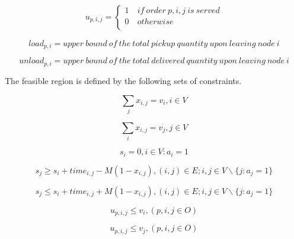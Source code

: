 \begin{equation}
   \begin{split}
   u_{p,i,j}=\left\{
                \begin{array}{ll}
                  1\ & if\ order\ p,i,j\ is\ served\\
                  0 & otherwise\\
                \end{array}
              \right.
   \end{split}
\end{equation}

\begin{equation}
   {load}_{p,i}=upper\ bound\ of\ the\ total\ pickup\ quantity\ upon\ leaving\ node\ i
\end{equation}

\begin{equation}
   {unload}_{p,i}=upper\ bound\ of\ the\ total\ delivered\ quantity\ upon\ leaving\ node\ i
\end{equation}

The feasible region is defined by the following sets of constraints.

\begin{equation}
\sum_{j}{x_{i,j}=v_i}, i\in V
\label{VRP_1}
\end{equation}

\begin{equation}
\sum_{i}{x_{i,j}=v_j}, j\in V
\label{VRP_2}
\end{equation}

\begin{equation}
s_i=0, i\in V:a_i=1
\label{VRP_3}
\end{equation}

\begin{equation}
s_j\geq s_i+time_{i,j}-M(1-x_{i,j}), \left(i,j\right)\in E;i,j\in V \backslash \{j:a_j=1\}
\label{VRP_4}
\end{equation}

\begin{equation}
s_j\le s_i+time_{i,j}+M(1-x_{i,j}), \left(i,j\right)\in E;i,j\in V \backslash \{j:a_j=1\}
\label{VRP_5}
\end{equation}

\begin{equation}
u_{p,i,j}\le v_i, (p,i,j\in O)
\label{VRP_6}
\end{equation}

\begin{equation}
u_{p,i,j}\le v_j, (p,i,j\in O)
\label{VRP_7}
\end{equation}


